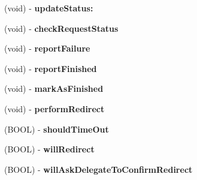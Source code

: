 \begin{DoxyCompactItemize}
\item 
\hypertarget{interface_a_s_i_h_t_t_p_request_07_08_ab0847444e15b9b0263c5bedd8faa151a}{
(void) -\/ {\bfseries update\-Status\-:}}
\label{interface_a_s_i_h_t_t_p_request_07_08_ab0847444e15b9b0263c5bedd8faa151a}

\item 
\hypertarget{interface_a_s_i_h_t_t_p_request_07_08_a068fc55ba6cb87ad880bded7fd78ab27}{
(void) -\/ {\bfseries check\-Request\-Status}}
\label{interface_a_s_i_h_t_t_p_request_07_08_a068fc55ba6cb87ad880bded7fd78ab27}

\item 
\hypertarget{interface_a_s_i_h_t_t_p_request_07_08_af147c15ba579966f7d4793ebe1eb881b}{
(void) -\/ {\bfseries report\-Failure}}
\label{interface_a_s_i_h_t_t_p_request_07_08_af147c15ba579966f7d4793ebe1eb881b}

\item 
\hypertarget{interface_a_s_i_h_t_t_p_request_07_08_aec6fbf664802e3be7fd4c24a9824e219}{
(void) -\/ {\bfseries report\-Finished}}
\label{interface_a_s_i_h_t_t_p_request_07_08_aec6fbf664802e3be7fd4c24a9824e219}

\item 
\hypertarget{interface_a_s_i_h_t_t_p_request_07_08_a3218690ab3ce9d401f26f7e0d0e2c995}{
(void) -\/ {\bfseries mark\-As\-Finished}}
\label{interface_a_s_i_h_t_t_p_request_07_08_a3218690ab3ce9d401f26f7e0d0e2c995}

\item 
\hypertarget{interface_a_s_i_h_t_t_p_request_07_08_a2862f6f1db8f1146e96470f926561b93}{
(void) -\/ {\bfseries perform\-Redirect}}
\label{interface_a_s_i_h_t_t_p_request_07_08_a2862f6f1db8f1146e96470f926561b93}

\item 
\hypertarget{interface_a_s_i_h_t_t_p_request_07_08_acedb1516f19af14df7b44602b700bae3}{
(\-B\-O\-O\-L) -\/ {\bfseries should\-Time\-Out}}
\label{interface_a_s_i_h_t_t_p_request_07_08_acedb1516f19af14df7b44602b700bae3}

\item 
\hypertarget{interface_a_s_i_h_t_t_p_request_07_08_af19d1ede897c67a86b4d8a62c6395863}{
(\-B\-O\-O\-L) -\/ {\bfseries will\-Redirect}}
\label{interface_a_s_i_h_t_t_p_request_07_08_af19d1ede897c67a86b4d8a62c6395863}

\item 
\hypertarget{interface_a_s_i_h_t_t_p_request_07_08_a38bb6d3bfc36a47f3ace0665762660ae}{
(\-B\-O\-O\-L) -\/ {\bfseries will\-Ask\-Delegate\-To\-Confirm\-Redirect}}
\label{interface_a_s_i_h_t_t_p_request_07_08_a38bb6d3bfc36a47f3ace0665762660ae}


\end{DoxyCompactItemize}
